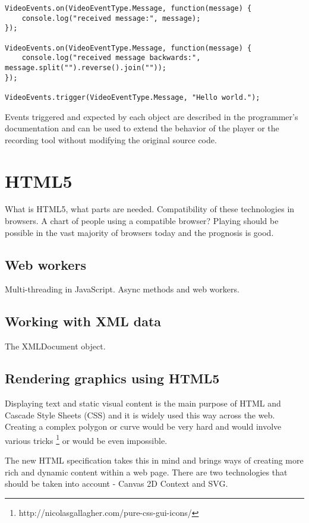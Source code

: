 \begin{verbatim}
VideoEvents.on(VideoEventType.Message, function(message) {
	console.log("received message:", message);
});

VideoEvents.on(VideoEventType.Message, function(message) {
	console.log("received message backwards:", message.split("").reverse().join(""));
});

VideoEvents.trigger(VideoEventType.Message, "Hello world.");
\end{verbatim}

Events triggered and expected by each object are described in the programmer's documentation and can be used to extend the behavior of the player or the recording tool without modifying the original source code.




\section{HTML5}

What is HTML5, what parts are needed. Compatibility of these technologies in browsers. A chart of people using a compatible browser? Playing should be possible in the vast majority of browsers today and the prognosis is good.

\subsection*{Web workers}
Multi-threading in JavaScript. Async methods and web workers.

\subsection*{Working with XML data}
The XMLDocument object.



\subsection{Rendering graphics using HTML5}

Displaying text and static visual content is the main purpose of HTML and Cascade Style Sheets (CSS) and it is widely used this way across the web. Creating a complex polygon or curve would be very hard and would involve various tricks \footnote{http://nicolasgallagher.com/pure-css-gui-icons/} or would be even impossible. 

The new HTML specification takes this in mind and brings ways of creating more rich and dynamic content within a web page. There are two technologies that should be taken into account - Canvas 2D Context and SVG.

